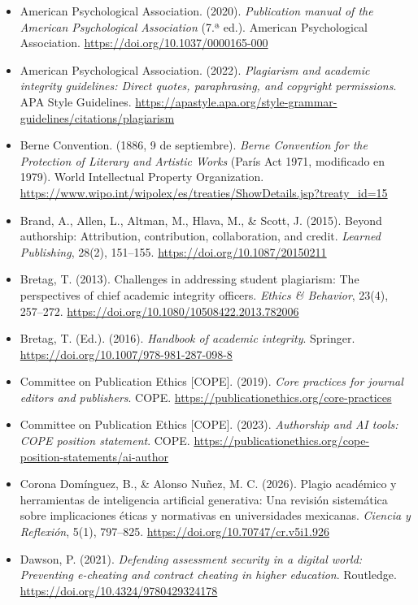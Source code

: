\begin{itemize}[leftmargin=1.5em, label={}, itemsep=0.22ex, parsep=0pt]
\small\raggedright
{}
\item American Psychological Association. (2020). \textit{Publication manual of the American Psychological Association} (7.ª ed.). American Psychological Association. \url{https://doi.org/10.1037/0000165-000}
\item American Psychological Association. (2022). \textit{Plagiarism and academic integrity guidelines: Direct quotes, paraphrasing, and copyright permissions}. APA Style Guidelines. \url{https://apastyle.apa.org/style-grammar-guidelines/citations/plagiarism}
\item Berne Convention. (1886, 9 de septiembre). \textit{Berne Convention for the Protection of Literary and Artistic Works} (París Act 1971, modificado en 1979). World Intellectual Property Organization. \url{https://www.wipo.int/wipolex/es/treaties/ShowDetails.jsp?treaty_id=15}
\item Brand, A., Allen, L., Altman, M., Hlava, M., \& Scott, J. (2015). Beyond authorship: Attribution, contribution, collaboration, and credit. \textit{Learned Publishing}, 28(2), 151--155. \url{https://doi.org/10.1087/20150211}
\item Bretag, T. (2013). Challenges in addressing student plagiarism: The perspectives of chief academic integrity officers. \textit{Ethics \& Behavior}, 23(4), 257--272. \url{https://doi.org/10.1080/10508422.2013.782006}
\item Bretag, T. (Ed.). (2016). \textit{Handbook of academic integrity}. Springer. \url{https://doi.org/10.1007/978-981-287-098-8}
\item Committee on Publication Ethics [COPE]. (2019). \textit{Core practices for journal editors and publishers}. COPE. \url{https://publicationethics.org/core-practices}
\item Committee on Publication Ethics [COPE]. (2023). \textit{Authorship and AI tools: COPE position statement}. COPE. \url{https://publicationethics.org/cope-position-statements/ai-author}
\item Corona Domínguez, B., \& Alonso Nuñez, M. C. (2026). Plagio académico y herramientas de inteligencia artificial generativa: Una revisión sistemática sobre implicaciones éticas y normativas en universidades mexicanas. \textit{Ciencia y Reflexión}, 5(1), 797--825. \url{https://doi.org/10.70747/cr.v5i1.926}
\item Dawson, P. (2021). \textit{Defending assessment security in a digital world: Preventing e-cheating and contract cheating in higher education}. Routledge. \url{https://doi.org/10.4324/9780429324178}

\end{itemize}
